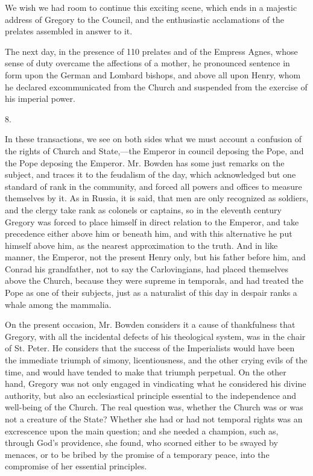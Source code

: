 We wish we had room to continue this exciting
scene, which ends in a majestic address of Gregory to the Council, and
the enthusiastic acclamations of the prelates assembled in answer to
it.

The next day, in the presence of 110 prelates and
of the Empress Agnes, whose sense of duty overcame the affections of a
mother, he pronounced sentence in form upon the German and Lombard
bishops, and above all upon Henry, whom he declared excommunicated
from the Church and suspended from the exercise of his imperial power.

8.

In these transactions, we see on both sides what
we must account a confusion of the rights of Church and State,—the
Emperor in council deposing the Pope, and the Pope deposing the
Emperor. Mr. Bowden has some just remarks on the subject, and traces
it to the feudalism of the day, which acknowledged but one standard of
rank in the community, and forced all powers and offices to measure
themselves by it. As in Russia, it is said, that men are only
recognized as soldiers, and the clergy take rank as colonels or
captains, so in the eleventh century Gregory was forced to place
himself in direct relation to the Emperor, and take precedence either
above him or beneath him, and with this alternative he put himself
above him, as the nearest approximation to the truth. And in like
manner, the Emperor, not the present Henry only, but his father
before him, and Conrad his grandfather, not to say the Carlovingians,
had placed themselves above the Church, because they were supreme in
temporals, and had treated the Pope as one of their subjects, just as
a naturalist of this day in despair ranks a whale among the mammalia.

On the present occasion, Mr. Bowden considers it
a cause of thankfulness that Gregory, with all the incidental defects
of his theological system, was in the chair of St. Peter. He considers
that the success of the Imperialists would have been the immediate
triumph of simony, licentiousness, and the other crying evils of the
time, and would have tended to make that triumph perpetual. On the
other hand, Gregory was not only engaged in vindicating what he
considered his divine authority, but also an ecclesiastical principle
essential to the independence and well-being of the Church. The real
question was, whether the Church was or was not a creature of the
State? Whether she had or had not temporal rights was an excrescence
upon the main question; and she needed a champion, such as, through
God's providence, she found, who scorned either to be swayed by
menaces, or to be bribed by the promise of a temporary peace, into the
compromise of her essential principles.

